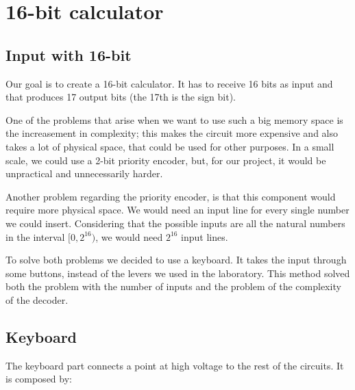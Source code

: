 \documentclass{article}
\begin{document}
\clearpage








\clearpage

\section{16-bit calculator} \label{SimulatedCalculator}



\subsection{Input with 16-bit}

Our goal is to create a 16-bit calculator. It has to receive 16 bits as input and that produces 17 output bits (the 17th is the sign bit).

\vspace{3mm}

One of the problems that arise when we want to use such a big memory space is the increasement in complexity; this makes the circuit more expensive and also takes a lot of physical space, that could be used for other purposes. In a small scale, we could use a 2-bit priority encoder, but, for our project, it would be unpractical and unnecessarily harder.

\vspace{3mm}

Another problem regarding the priority encoder, is that this component would require more physical space. We would need an input line for every single number we could insert. Considering that the possible inputs are all the natural numbers in the interval $[0,2^{16})$, we would need $2^{16}$ input lines.

\vspace{3mm}

To solve both problems we decided to use a keyboard. It takes the input through some buttons, instead of the levers we used in the laboratory. This method solved both the problem with the number of inputs and the problem of the complexity of the decoder.



\subsection{Keyboard}

The keyboard part connects a point at high voltage to the rest of the circuits. It is composed by: 
\end{document}
